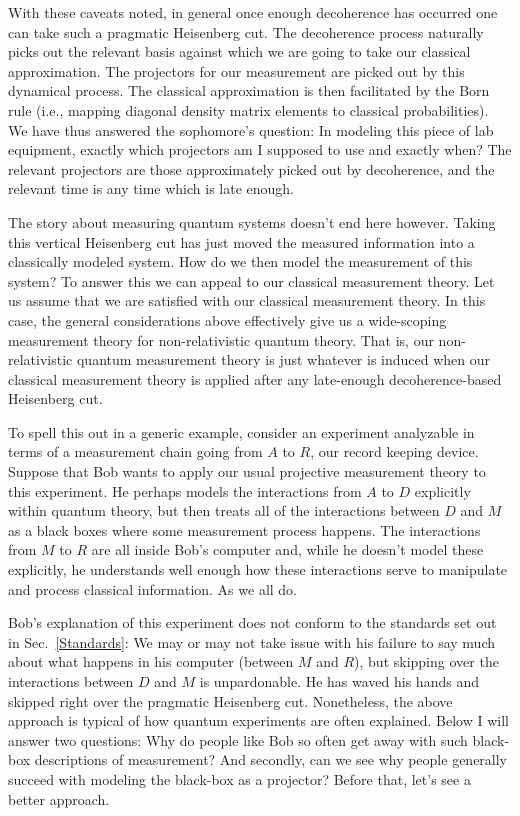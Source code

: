 \documentclass[prd,twocolumn,superscriptaddress,floatfix,amsmath,amssymb,amsfonts,nofootinbib]{revtex4-2}
\begin{document}
With these caveats noted, in general once enough decoherence has occurred one can take such a pragmatic Heisenberg cut. The decoherence process naturally picks out the relevant basis against which we are going to take our classical approximation. The projectors for our measurement are picked out by this dynamical process. The classical approximation is then facilitated by the Born rule (i.e., mapping diagonal density matrix elements to classical probabilities). We have thus answered the sophomore's question: In modeling this piece of lab equipment, exactly which projectors am I supposed to use and exactly when? The relevant projectors are those approximately picked out by decoherence, and the relevant time is any time which is late enough.

The story about measuring quantum systems doesn't end here however. Taking this vertical Heisenberg cut has just moved the measured information into a classically modeled system. How do we then model the measurement of this system? To answer this we can appeal to our classical measurement theory. Let us assume that we are satisfied with our classical measurement theory. In this case, the general considerations above effectively give us a wide-scoping measurement theory for non-relativistic quantum theory. That is, our non-relativistic quantum measurement theory is just whatever is induced when our classical measurement theory is applied after any late-enough decoherence-based Heisenberg cut.

To spell this out in a generic example, consider an experiment analyzable in terms of a measurement chain going from $A$ to $R$, our record keeping device. Suppose that Bob wants to apply our usual projective measurement theory to this experiment. He perhaps models the interactions from $A$ to $D$ explicitly within quantum theory, but then treats all of the interactions between $D$ and $M$ as a black boxes where some measurement process happens. The interactions from $M$ to $R$ are all inside Bob's computer and, while he doesn't model these explicitly, he understands well enough how these interactions serve to manipulate and process classical information. As we all do.

Bob's explanation of this experiment does not conform to the standards set out in Sec.~\ref{Standards}: We may or may not take issue with his failure to say much about what happens in his computer (between $M$ and $R$), but skipping over the interactions between $D$ and $M$ is unpardonable. He has waved his hands and skipped right over the pragmatic Heisenberg cut. Nonetheless, the above approach is typical of how quantum experiments are often explained. Below I will answer two questions: Why do people like Bob so often get away with such black-box descriptions of measurement? And secondly, can we see why people generally succeed with modeling the black-box as a projector? Before that, let's see a better approach. 
\end{document}
